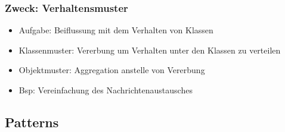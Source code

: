 \documentclass[11pt, fleqn, a4paper, leqno]{scrartcl} %
\begin{document}
		\subsubsection{Zweck: Verhaltensmuster}
			\begin{itemize}
				\item Aufgabe: Beiflussung mit dem Verhalten von Klassen
				\item Klassenmuster: Vererbung um Verhalten unter den Klassen zu verteilen
				\item Objektmuster: Aggregation anstelle von Vererbung
				\item Bsp: Vereinfachung des Nachrichtenaustausches
			\end{itemize}
	\newpage
	\subsection{Patterns}
\end{document}
